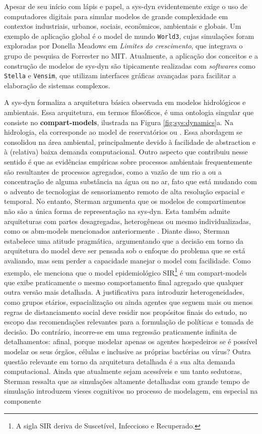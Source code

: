 \documentclass[./main.tex]{subfiles}
\begin{document}
\noindent Apesar de seu início com lápis e papel, a \gls{sys-dyn} evidentemente exige o uso de computadores digitais para simular modelos de grande complexidade em contextos industriais, urbanos, sociais, econômicos, ambientais e globais. Um exemplo de aplicação global é o \gls{model} de mundo \texttt{World3}, cujas simulações foram exploradas por Donella Meadows em \textit{Limites do crescimento}, que integrava o grupo de pesquisa de Forrester no MIT. Atualmente, a aplicação dos conceitos e a construção de modelos de \gls{sys-dyn} são tipicamente realizadas com \textit{softwares} como \texttt{Stella} e \texttt{Vensim}, que utilizam interfaces gráficas avançadas para facilitar a elaboração de sistemas complexos.

\par A \gls{sys-dyn} formaliza a arquitetura básica observada em modelos hidrológicos e ambientais. Essa arquitetura, em termos filosóficos, é uma ontologia singular que consiste no \textbf{\gls{compart-models}}, ilustrada na Figura \ref{fig:sys:dynamics}a. Na hidrologia, ela corresponde ao \gls{model} de reservatórios ou . Essa abordagem se consolidou na área ambiental, principalmente devido à facilidade de \gls{abstraction} e à (relativa) baixa demanda computacional. Outro aspecto que contribuiu nesse sentido é que as evidências empíricas sobre processos ambientais frequentemente são resultantes de processos agregados, como a vazão de um rio a ou a concentração de alguma substância na água ou no ar, fato que está mudando com o advento de tecnologias de sensoriamento remoto de alta resolução espacial e temporal. No entanto, Sterman argumenta que os modelos de compartimentos não são a única forma de representação na \gls{sys-dyn}. Esta também admite arquiteturas com partes desagregadas, heterogêneas ou mesmo individualizadas, como os \gls{abm-models} mencionados anteriormente \cite{sterman2018}. Diante disso, Sterman estabelece uma atitude pragmática, argumentando que a decisão em torno da arquitetura do \gls{model} deve ser pensada sob o enfoque do problema que se está avaliando, mas sem perder a capacidade manejar o \gls{model} com facilidade. Como exemplo, ele menciona que o \gls{model} epidemiológico SIR\footnote{A sigla SIR deriva de Suscetível, Infeccioso e Recuperado.} é um \gls{compart-models} que exibe praticamente o mesmo comportamento final agregado que qualquer outra versão mais detalhada. A justificativa para introduzir heterogeneidades, como grupos etários, espacialização ou ainda agentes que seguem mais ou menos regras de distanciamento social deve residir nos propósitos finais do estudo, no escopo das recomendações relevantes para a formulação de políticas e tomada de decisão. Do contrário, incorre-se em uma regressão praticamente infinita de detalhamentos: afinal, porque modelar apenas os agentes hospedeiros se é possível modelar os seus órgãos, células e inclusive as próprias bactérias ou vírus? Outra questão relevante em torno da arquitetura detalhada é a sua alta demanda computacional. Ainda que atualmente sejam acessíveis e um tanto sedutoras, Sterman ressalta que as simulações altamente detalhadas com grande tempo de simulação introduzem vieses cognitivos no processo de modelagem, em especial na componente 
\end{document}
